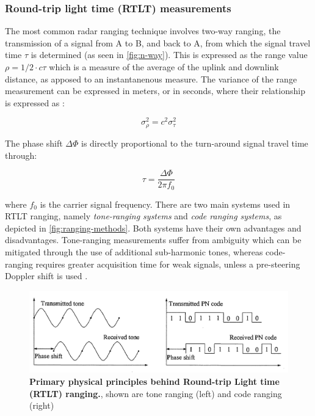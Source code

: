 \subsubsection{Round-trip light time (RTLT) measurements}

The most common radar ranging technique involves two-way ranging, the
transmission of a signal from A to B, and back to A, from which the signal
travel time $\tau$ is determined (as seen in \autoref{fig:n-way}). This is
expressed as the range value $\rho=1/2\cdot{}c\tau$ which is a measure of the
average of the uplink and downlink distance, as apposed to an instantanenous
measure. The variance of the range measurement can be expressed in meters, or in
seconds, where their relationship is expressed as \cite{Berner2002}:

\begin{equation}
    \sigma_{\rho}^2 = c^2\sigma_{\tau}^2
\end{equation}

The phase shift $\Delta\Phi$ is directly proportional to the
turn-around signal travel time through:

\begin{equation}
    \tau = \frac{\Delta\Phi}{2\pi{}f_0}
\end{equation}

where $f_0$ is the carrier signal frequency. There are two main systems used in
RTLT ranging, namely \textit{tone-ranging systems} and \textit{code ranging
    systems}, as depicted in \autoref{fig:ranging-methods}. Both systems have their
own advantages and disadvantages. Tone-ranging measurements suffer from
ambiguity which can be mitigated through the use of additional sub-harmonic
tones, whereas code-ranging requires greater acquisition time for weak signals,
unless a pre-steering Doppler shift is used \cite[p.~197]{Montenbruck2000}.

\begin{figure}
    \centering
    \includegraphics[width=1.0\linewidth]{graphics/ranging-method.PNG}
    \caption{
        \textbf{Primary physical principles behind Round-trip Light time (RTLT)
            ranging.}, shown are tone ranging (left) and code ranging (right)
        \cite[p.~196]{Montenbruck2000}
    }
    \label{fig:ranging-methods}
\end{figure}


